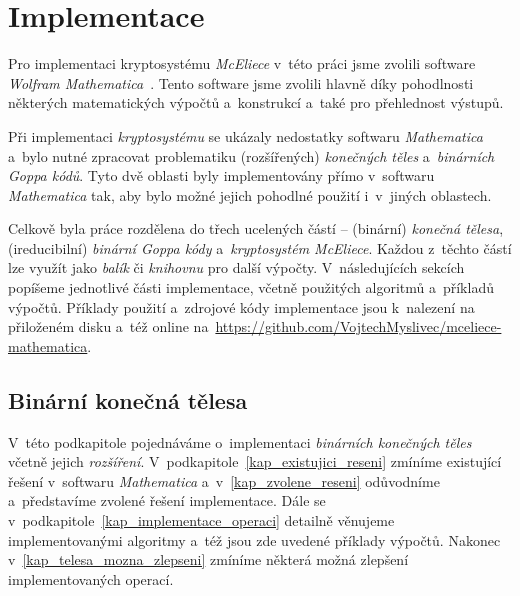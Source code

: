 \documentclass[thesis=M,czech,hidelinks]{FITthesis}[2012/06/26]
\newcommand{\0}{{\textcolor[gray]{0.75}{0}}}
\begin{document}
\chapter{Implementace}\label{kap_implementace}

Pro implementaci kryptosystému \emph{McEliece} v~této práci jsme zvolili
software \emph{Wolfram Mathematica}~\cite{Mathematica}. Tento software jsme
zvolili hlavně díky pohodlnosti některých matematických výpočtů a~konstrukcí
a~také pro přehlednost výstupů.

Při implementaci \emph{kryptosystému} se ukázaly nedostatky softwaru
\emph{Mathematica} a~bylo nutné zpracovat problematiku (rozšířených)
\emph{konečných těles} a~\emph{binárních Goppa kódů}. Tyto dvě oblasti byly
implementovány přímo v~softwaru \emph{Mathematica} tak, aby bylo možné jejich
pohodlné použití i~v~jiných oblastech.

Celkově byla práce rozdělena do třech ucelených částí -- (binární) \emph{konečná
tělesa}, (ireducibilní) \emph{binární Goppa kódy} a~\emph{kryptosystém
McEliece}. Každou z~těchto částí lze využít jako \emph{balík} či \emph{knihovnu}
pro další výpočty. V~následujících sekcích popíšeme jednotlivé části
implementace, včetně použitých algoritmů a~příkladů výpočtů. Příklady použití
a~zdrojové kódy implementace jsou k~nalezení na přiloženém disku a~též online
na~\url{https://github.com/VojtechMyslivec/mceliece-mathematica}.



\section{Binární konečná tělesa}\label{kap_implementace_teles}

V~této podkapitole pojednáváme o~implementaci \emph{binárních konečných těles}
včetně jejich \emph{rozšíření}. V~podkapitole~\ref{kap_existujici_reseni}
zmíníme existující řešení v~softwaru \emph{Mathematica}
a~v~\ref{kap_zvolene_reseni} odůvodníme a~představíme zvolené řešení
implementace. Dále se v~podkapitole~\ref{kap_implementace_operaci} detailně
věnujeme implementovanými algoritmy a~též jsou zde uvedené příklady výpočtů.
Nakonec v~\ref{kap_telesa_mozna_zlepseni} zmíníme některá možná zlepšení
implementovaných operací.
\end{document}
